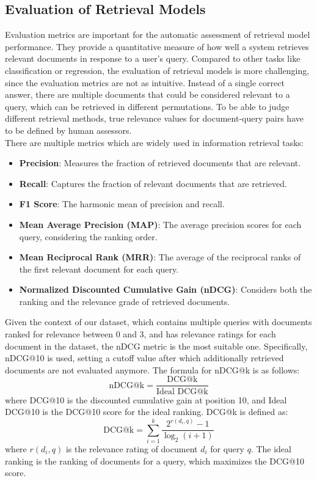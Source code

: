 \subsection{Evaluation of Retrieval Models}\label{sec:evaluation-of-retrieval-models}
Evaluation metrics are important for the automatic assessment of retrieval model performance.
They provide a quantitative measure of how well a system retrieves relevant documents in response to a user's query.
Compared to other tasks like classification or regression, the evaluation of retrieval models is more challenging, since the evaluation metrics are not as intuitive.
Instead of a single correct answer, there are multiple documents that could be considered relevant to a query, which can be retrieved in different permutations.
To be able to judge different retrieval methods, true relevance values for document-query pairs have to be defined by human assessors.
\\
There are multiple metrics which are widely used in information retrieval tasks:
\begin{itemize}
    \item \textbf{Precision}: Measures the fraction of retrieved documents that are relevant.
    \item \textbf{Recall}: Captures the fraction of relevant documents that are retrieved.
    \item \textbf{F1 Score}: The harmonic mean of precision and recall.
    \item \textbf{Mean Average Precision (MAP)}: The average precision scores for each query, considering the ranking order.
    \item \textbf{Mean Reciprocal Rank (MRR)}: The average of the reciprocal ranks of the first relevant document for each query.
    \item \textbf{Normalized Discounted Cumulative Gain (nDCG)}: Considers both the ranking and the relevance grade of retrieved documents.
\end{itemize}
Given the context of our dataset, which contains multiple queries with documents ranked for relevance between 0 and 3, and has relevance ratings for each document in the dataset, the nDCG metric is the most suitable one.
Specifically, nDCG@10 is used, setting a cutoff value after which additionally retrieved documents are not evaluated anymore.
The formula for nDCG@k is as follows:
\[ \text{nDCG@k} = \frac{\text{DCG@k}}{\text{Ideal DCG@k}} \]
where DCG@10 is the discounted cumulative gain at position 10, and Ideal DCG@10 is the DCG@10 score for the ideal ranking.
DCG@k is defined as:
\[ \text{DCG@k} = \sum_{i=1}^{k} \frac{2^{r(d_i,q)} - 1}{\log_2(i + 1)} \]
where $r(d_i,q)$ is the relevance rating of document $d_i$ for query $q$.
The ideal ranking is the ranking of documents for a query, which maximizes the DCG@10 score.
\\


